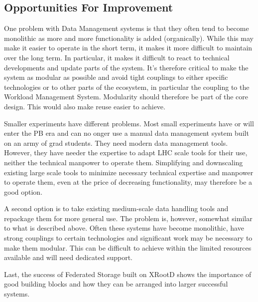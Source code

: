 \subsection{Opportunities For Improvement}
One problem with Data Management systems is that they often tend to become monolithic as more and more functionality is 
added (organically). While this may make it easier to operate in the short term, it makes it more difficult to maintain over 
the long term. In particular, it makes it difficult to react to technical developments and update parts of the system. It's 
therefore critical to make the system as modular as possible and avoid tight couplings to either specific technologies or 
to other parts of the ecosystem, in particular the coupling to the Workload Management System. Modularity should therefore be 
part of the core design. This would also make reuse easier to achieve. 
\par Smaller experiments have different problems. Most small experiments have or will enter the PB era and can no onger use a manual 
data management system built on an army of grad students. They need modern data management tools. However, they have needer the 
expertise to adapt LHC scale tools for their use, neither the technical manpower to operate them. Simplifying and downscaling existing 
large scale tools to minimize necessary technical expertise and manpower to operate them, even at the price of decreasing functionality, 
may therefore be a good option. 
\par A second option is to take existing medium-scale data handling tools and repackage them for more general use. The problem is, 
however, somewhat similar to what is described above. Often these systems have become monolithic, have strong couplings to certain 
technologies and significant work may be 
necessary to make them modular. This can be difficult to achieve within the limited resources available and will need dedicated support.
\par Last, the success of Federated Storage built on XRootD shows the importance of good building blocks and how they can be arranged into 
larger successful systems.






